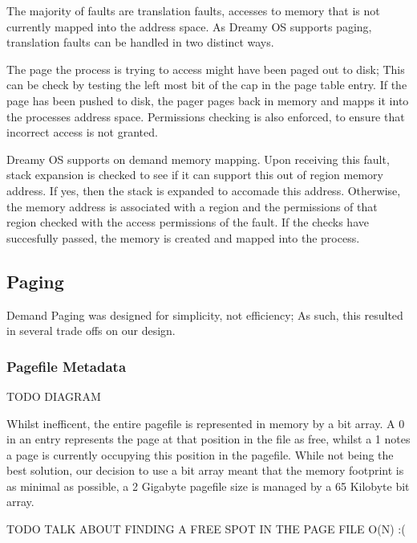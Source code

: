 \documentclass[runningheads,a4paper]{llncs}
\begin{document}
The majority of faults are translation faults, accesses to memory that is not currently mapped into the address space. As Dreamy OS supports paging, translation faults can be handled in two distinct ways.


The page the process is trying to access might have been paged out to disk; This can be check by testing the left most bit of the cap in the page table entry. If the page has been pushed to disk, the pager pages back in memory and mapps it into the processes address space. Permissions checking is also enforced, to ensure that incorrect access is not granted.


Dreamy OS supports on demand memory mapping. Upon receiving this fault, stack expansion is checked to see if it can support this out of region memory address. If yes, then the stack is expanded to accomade this address. Otherwise, the memory address is associated with a region and the permissions of that region checked with the access permissions of the fault. If the checks have succesfully passed, the memory is created and mapped into the process.

\medskip
\medskip

\subsection{Paging}

Demand Paging was designed for simplicity, not efficiency; As such, this resulted in several trade offs on our design.

\subsubsection{Pagefile Metadata}

TODO DIAGRAM

Whilst inefficent, the entire pagefile is represented in memory by a bit array. A 0 in an entry represents the page at that position in the file as free, whilst a 1 notes a page is currently occupying this position in the pagefile. While not being the best solution, our decision to use a bit array meant that the memory footprint is as minimal as possible, a 2 Gigabyte pagefile size is managed by a 65 Kilobyte bit array.

TODO TALK ABOUT FINDING A FREE SPOT IN THE PAGE FILE O(N) :(
\end{document}
